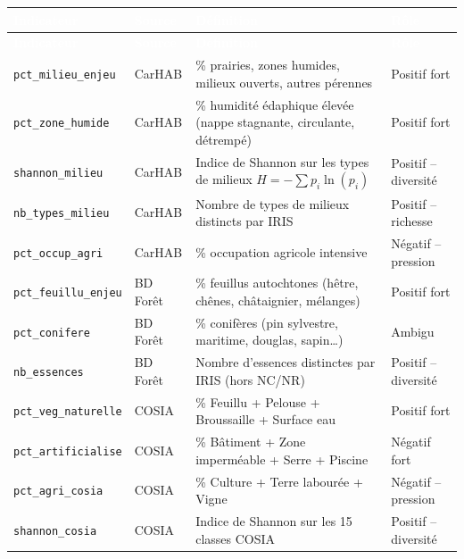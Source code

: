 \documentclass[11pt,a4paper]{report}
\begin{document}
\begin{longtable}{L{3cm} L{1.8cm} L{5cm} L{2.5cm}}
  \toprule
  \textcolor{white}{\textbf{Indicateur}} &
  \textcolor{white}{\textbf{Source}} &
  \textcolor{white}{\textbf{Définition}} &
  \textcolor{white}{\textbf{Rôle}} \\
  \midrule
  \endfirsthead
  \toprule
  \textcolor{white}{\textbf{Indicateur}} &
  \textcolor{white}{\textbf{Source}} &
  \textcolor{white}{\textbf{Définition}} &
  \textcolor{white}{\textbf{Rôle}} \\
  \midrule
  \endhead
  \bottomrule
  \endfoot

  \texttt{pct\_milieu\_enjeu} & CarHAB &
    \% prairies, zones humides, milieux ouverts, autres pérennes & Positif fort \\

  \texttt{pct\_zone\_humide} & CarHAB &
    \% humidité édaphique élevée (nappe stagnante, circulante, détrempé) & Positif fort \\

  \texttt{shannon\_milieu} & CarHAB &
    Indice de Shannon sur les types de milieux $H = -\sum p_i \ln(p_i)$ & Positif -- diversité \\

  \texttt{nb\_types\_milieu} & CarHAB &
    Nombre de types de milieux distincts par IRIS & Positif -- richesse \\

  \texttt{pct\_occup\_agri} & CarHAB &
    \% occupation agricole intensive & Négatif -- pression \\

  \texttt{pct\_feuillu\_enjeu} & BD Forêt &
    \% feuillus autochtones (hêtre, chênes, châtaignier, mélanges) & Positif fort \\

  \texttt{pct\_conifere} & BD Forêt &
    \% conifères (pin sylvestre, maritime, douglas, sapin\ldots) & Ambigu \\

  \texttt{nb\_essences} & BD Forêt &
    Nombre d'essences distinctes par IRIS (hors NC/NR) & Positif -- diversité \\

  \texttt{pct\_veg\_naturelle} & COSIA &
    \% Feuillu + Pelouse + Broussaille + Surface eau & Positif fort \\

  \texttt{pct\_artificialise} & COSIA &
    \% Bâtiment + Zone imperméable + Serre + Piscine & Négatif fort \\

  \texttt{pct\_agri\_cosia} & COSIA &
    \% Culture + Terre labourée + Vigne & Négatif -- pression \\

  \texttt{shannon\_cosia} & COSIA &
    Indice de Shannon sur les 15 classes COSIA & Positif -- diversité \\
\end{longtable}
\end{document}
